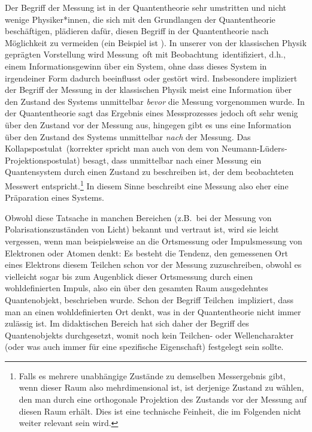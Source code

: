 Der Begriff der Messung ist in der Quantentheorie sehr umstritten und nicht wenige
Physiker*innen, die sich mit den Grundlangen der Quantentheorie besch\"aftigen, pl\"adieren
daf\"ur, diesen Begriff in der Quantentheorie nach M\"oglichkeit zu vermeiden (ein Beispiel ist \cite{Bell}). In unserer von
der klassischen Physik gepr\"agten Vorstellung wird \glqq Messung\grqq\ oft mit \glqq Beobachtung\grqq\ identifiziert,
d.h., einem Informationsgewinn \"uber ein System, ohne dass dieses System in irgendeiner
Form dadurch beeinflusst oder gest\"ort wird. Insbesondere impliziert der Begriff der Messung in
der klassischen Physik meist eine 
Information \"uber den Zustand des Systems unmittelbar \textit{bevor} die Messung vorgenommen
wurde. In der Quantentheorie sagt das Ergebnis eines Messprozesses jedoch oft sehr wenig
\"uber den Zustand vor der Messung aus, hingegen gibt es uns eine Information \"uber den
Zustand des Systems unmittelbar \textit{nach} der Messung. Das \glqq Kollapspostulat\grqq\ (korrekter
spricht man auch von dem \glqq von Neumann-L\"uders-Projektionspostulat\grqq) besagt, dass
unmittelbar nach einer Messung ein Quantensys\-tem durch einen Zustand zu beschreiben ist, der
dem beobachteten Messwert entspricht.\footnote{Falls es mehrere unabh\"angige Zust\"ande
zu demselben Messergebnis gibt, wenn dieser Raum also mehrdimensional ist, ist derjenige Zustand zu 
w\"ahlen, den man durch eine orthogonale Projektion des Zustands vor der Messung auf diesen Raum 
erh\"alt. Dies ist eine technische Feinheit, die im Folgenden nicht weiter relevant sein wird.}
In diesem Sinne beschreibt eine Messung also eher eine Pr\"aparation eines Systems.

Obwohl diese Tatsache in manchen Bereichen (z.B.\ bei der Messung von Polarisationszust\"anden
von Licht) bekannt und vertraut ist, wird sie leicht vergessen, wenn man beispielsweise an die Ortsmessung oder
Impulsmessung von Elektronen oder Atomen denkt: Es besteht die Tendenz, den gemessenen Ort
eines Elektrons diesem Teilchen schon vor der Messung zuzuschreiben, obwohl es vielleicht sogar bis zum
Augenblick dieser Ortsmessung durch einen wohldefinierten Impuls, also ein \"uber den gesamten Raum
ausgedehntes Quantenobjekt, beschrieben wurde. Schon der Begriff \glqq Teilchen\grqq\ impliziert, dass
man an einen wohldefinierten Ort denkt, was in der Quantentheorie nicht immer zul\"assig ist. Im 
didaktischen Bereich hat sich daher der Begriff des Quantenobjekts durchgesetzt, womit noch kein
Teilchen- oder Wellencharakter (oder was auch immer f\"ur eine spezifische Eigenschaft) festgelegt sein
sollte.

